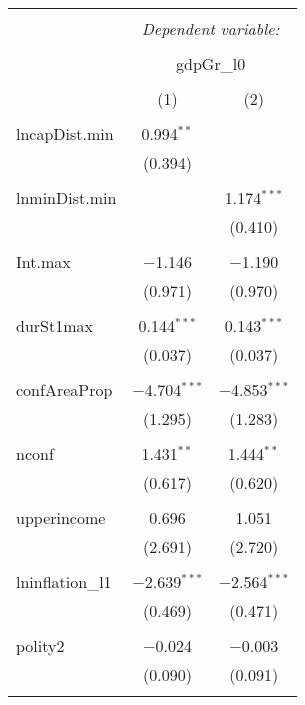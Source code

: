 
\begin{table}[!htbp] \centering 
  \caption{} 
  \label{} 
\begin{tabular}{@{\extracolsep{5pt}}lcc} 
\\[-1.8ex]\hline 
\hline \\[-1.8ex] 
 & \multicolumn{2}{c}{\textit{Dependent variable:}} \\ 
\cline{2-3} 
\\[-1.8ex] & \multicolumn{2}{c}{gdpGr\_l0} \\ 
\\[-1.8ex] & (1) & (2)\\ 
\hline \\[-1.8ex] 
 lncapDist.min & 0.994$^{**}$ &  \\ 
  & (0.394) &  \\ 
  & & \\ 
 lnminDist.min &  & 1.174$^{***}$ \\ 
  &  & (0.410) \\ 
  & & \\ 
 Int.max & $-$1.146 & $-$1.190 \\ 
  & (0.971) & (0.970) \\ 
  & & \\ 
 durSt1max & 0.144$^{***}$ & 0.143$^{***}$ \\ 
  & (0.037) & (0.037) \\ 
  & & \\ 
 confAreaProp & $-$4.704$^{***}$ & $-$4.853$^{***}$ \\ 
  & (1.295) & (1.283) \\ 
  & & \\ 
 nconf & 1.431$^{**}$ & 1.444$^{**}$ \\ 
  & (0.617) & (0.620) \\ 
  & & \\ 
 upperincome & 0.696 & 1.051 \\ 
  & (2.691) & (2.720) \\ 
  & & \\ 
 lninflation\_l1 & $-$2.639$^{***}$ & $-$2.564$^{***}$ \\ 
  & (0.469) & (0.471) \\ 
  & & \\ 
 polity2 & $-$0.024 & $-$0.003 \\ 
  & (0.090) & (0.091) \\ 
  & & \\ 

\end{tabular}
\end{table}
